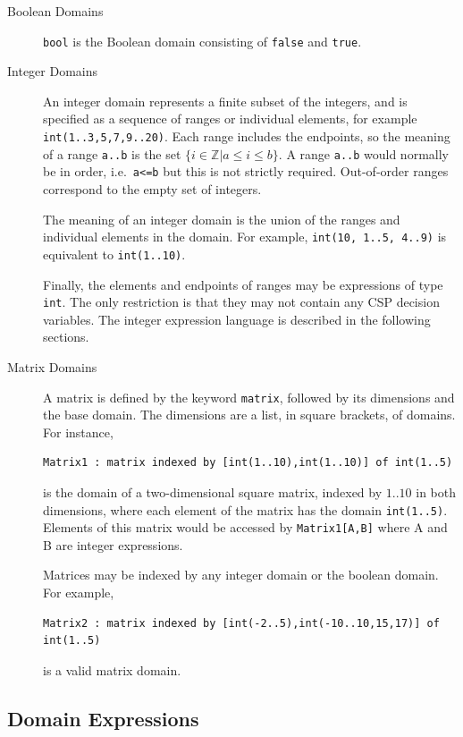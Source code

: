 \documentclass[a4paper]{article}
\begin{document}
\begin{description}

\item[Boolean Domains]
{\tt bool} is the Boolean domain consisting of {\tt false} and {\tt true}.

\item[Integer Domains]
An integer domain represents a finite subset of the integers, and is specified 
as a sequence of ranges or individual elements, for example 
{\tt int(1..3,5,7,9..20)}. Each range includes the endpoints, so the meaning of a range {\tt a..b} is the set 
\(\{ i \in \mathbb{Z} | a\le i \le b \}\). A range {\tt a..b} would normally be 
in order, i.e.~{\tt a<=b} but this is not strictly required. Out-of-order ranges 
correspond to the empty set of integers. 

The meaning of an integer domain is the union of the ranges and individual elements in the domain. 
For example, {\tt int(10, 1..5, 4..9)} is equivalent to {\tt int(1..10)}. 

Finally, the elements and endpoints of ranges may be expressions of type {\tt int}. 
The only restriction is that they may not contain any CSP decision variables.  
The integer expression language is described in the following sections.

\item[Matrix Domains]
A matrix is defined by the keyword {\tt matrix}, followed by its dimensions and 
the base domain. The dimensions are a list, in square brackets, of domains.
For instance,
\begin{verbatim}
Matrix1 : matrix indexed by [int(1..10),int(1..10)] of int(1..5) 
\end{verbatim}
is the domain of a two-dimensional square matrix, indexed by $1..10$ in both dimensions,
where each element of the matrix has the domain {\tt int(1..5)}. Elements of this matrix would 
be accessed by {\tt Matrix1[A,B]} where A and B are integer expressions. 

Matrices may be indexed by any integer domain or the boolean domain. For example, 

\begin{verbatim}
Matrix2 : matrix indexed by [int(-2..5),int(-10..10,15,17)] of int(1..5)
\end{verbatim}

is a valid matrix domain.

\end{description}

\subsection{Domain Expressions}\label{sec:domainexpressions}
\end{document}
